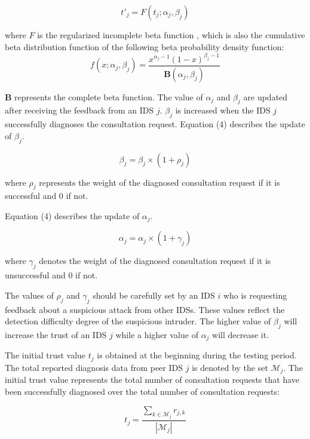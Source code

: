 \documentclass[conference]{IEEEtran}
\begin{document}
\begin{equation}
t'_{j}=F(t_{j};\alpha_{j},\beta_{j})
\end{equation}

where $F$ is the regularized incomplete beta function
\cite{josang2002beta}, which is also the cumulative beta distribution function
of the following beta probability density function:
\begin{equation}
f(x;\alpha_{j},\beta_{j})=\frac{x^{\alpha_{j}-1}(1-x)^{\beta_{j}-1}}{\mathbf{B}(\alpha_{j},\beta_{j})}
\end{equation}

$\mathbf{B}$ represents the complete beta function. The value of $\alpha_{j}$ and
$\beta_{j}$ are updated after receiving the feedback from
an IDS $j$. $\beta_{j}$ is increased when the IDS $j$
successfully diagnoses the consultation request. Equation (4) describes the
update of $\beta_{j}$.

\begin{equation}
\beta_{j} = \beta_{j} \times (1+\rho_{j})
\end{equation}

where $\rho_{j}$ represents the weight of the diagnosed consultation request
if it is successful and 0 if not.

Equation (4) describes the update of $\alpha_{j}$.

\begin{equation}
\alpha_{j} = \alpha_{j} \times (1+\gamma_{j})
\end{equation}

where $\gamma_{j}$ denotes the weight of the diagnosed consultation request
if it is unsuccessful and 0 if not.

The values of $\rho_{j}$ and $\gamma_{j}$ should be carefully set by an IDS $i$ who is requesting feedback about a suspicious attack from other IDSs. These values reflect the detection difficulty degree of the suspicious intruder. The higher value of $\beta_{j}$ will increase the trust of an IDS $j$ while a higher value of $\alpha_{j}$ will decrease it.

The initial trust value $t_{j}$ is obtained at the beginning during the testing period. The total reported diagnosis data from peer IDS $j$ is denoted by the set $\mathcal{M}_{j}$. The initial trust value represents the total number of consultation requests that have been successfully diagnosed over the total number of consultation requests:

\begin{equation}
t_{j}=\frac{\sum_{k \in \mathcal{M}_{j}} r_{j,k}}{|\mathcal{M}_{j}|}
\end{equation}
\end{document}
